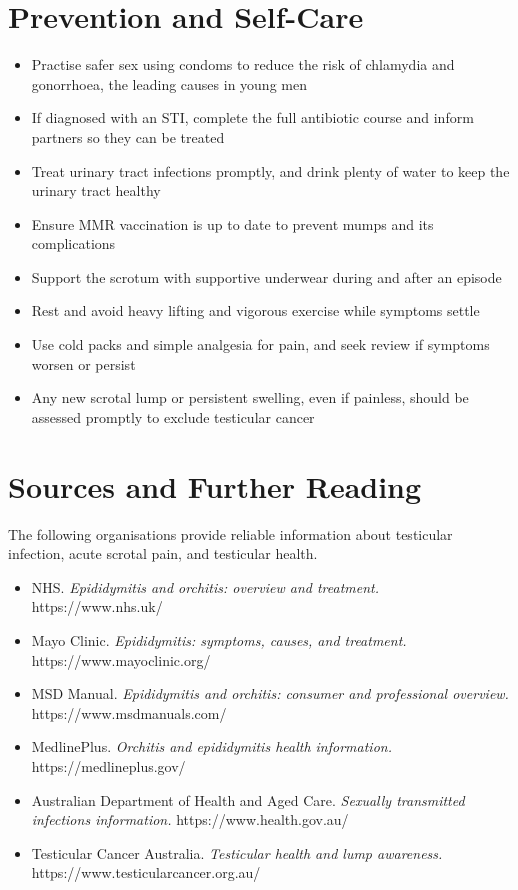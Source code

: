 \section*{Prevention and Self-Care}
\begin{itemize}
    \item Practise safer sex using condoms to reduce the risk of chlamydia and gonorrhoea, the leading causes in young men
    \item If diagnosed with an STI, complete the full antibiotic course and inform partners so they can be treated
    \item Treat urinary tract infections promptly, and drink plenty of water to keep the urinary tract healthy
    \item Ensure MMR vaccination is up to date to prevent mumps and its complications
    \item Support the scrotum with supportive underwear during and after an episode
    \item Rest and avoid heavy lifting and vigorous exercise while symptoms settle
    \item Use cold packs and simple analgesia for pain, and seek review if symptoms worsen or persist
    \item Any new scrotal lump or persistent swelling, even if painless, should be assessed promptly to exclude testicular cancer
\end{itemize}

\section*{Sources and Further Reading}
The following organisations provide reliable information about testicular infection, acute scrotal pain, and testicular health.

\begin{itemize}
    \item NHS. \textit{Epididymitis and orchitis: overview and treatment.} https://www.nhs.uk/
    \item Mayo Clinic. \textit{Epididymitis: symptoms, causes, and treatment.} https://www.mayoclinic.org/
    \item MSD Manual. \textit{Epididymitis and orchitis: consumer and professional overview.} https://www.msdmanuals.com/
    \item MedlinePlus. \textit{Orchitis and epididymitis health information.} https://medlineplus.gov/
    \item Australian Department of Health and Aged Care. \textit{Sexually transmitted infections information.} https://www.health.gov.au/
    \item Testicular Cancer Australia. \textit{Testicular health and lump awareness.} https://www.testicularcancer.org.au/
\end{itemize}
